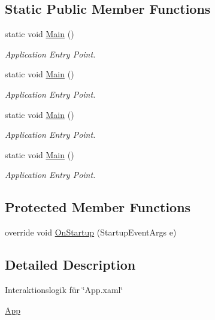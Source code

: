 \subsection*{Static Public Member Functions}
\begin{DoxyCompactItemize}
\item 
static void \hyperlink{class_rowing_monitor_1_1_app_a3cb5b8569d044cd9687827e6c2072b7e}{Main} ()
\begin{DoxyCompactList}\small\item\em Application Entry Point. \end{DoxyCompactList}\item 
static void \hyperlink{class_rowing_monitor_1_1_app_a3cb5b8569d044cd9687827e6c2072b7e}{Main} ()
\begin{DoxyCompactList}\small\item\em Application Entry Point. \end{DoxyCompactList}\item 
static void \hyperlink{class_rowing_monitor_1_1_app_a3cb5b8569d044cd9687827e6c2072b7e}{Main} ()
\begin{DoxyCompactList}\small\item\em Application Entry Point. \end{DoxyCompactList}\item 
static void \hyperlink{class_rowing_monitor_1_1_app_a3cb5b8569d044cd9687827e6c2072b7e}{Main} ()
\begin{DoxyCompactList}\small\item\em Application Entry Point. \end{DoxyCompactList}\end{DoxyCompactItemize}
\subsection*{Protected Member Functions}
\begin{DoxyCompactItemize}
\item 
override void \hyperlink{class_rowing_monitor_1_1_app_a66e9b3baf5c2db1300758dddf3156f2f}{On\+Startup} (Startup\+Event\+Args e)
\end{DoxyCompactItemize}


\subsection{Detailed Description}
Interaktionslogik für \char`\"{}\+App.\+xaml\char`\"{} 

\hyperlink{class_rowing_monitor_1_1_app}{App} 

